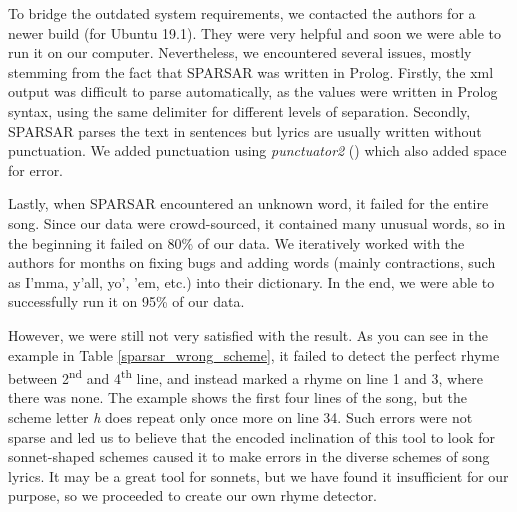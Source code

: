 To bridge the outdated system requirements, we contacted the authors for a newer build (for Ubuntu 19.1). They were very helpful and soon we were able to run it on our computer. Nevertheless, we encountered several issues, mostly stemming from the fact that SPARSAR was written in Prolog. Firstly, the xml output was difficult to parse automatically, as the values were written in Prolog syntax, using the same delimiter for different levels of separation. Secondly, SPARSAR parses the text in sentences but lyrics are usually written without punctuation. We added punctuation using \textit{punctuator2} (\cite{tilk2016punctuation}) which also added space for error. 

Lastly, when SPARSAR encountered an unknown word, it failed for the entire song. Since our data were crowd-sourced, it contained many unusual words, so in the beginning it failed on 80\% of our data. We iteratively worked with the authors for months on fixing bugs and adding words (mainly contractions, such as I'mma, y'all, yo', 'em, etc.) into their dictionary. In the end, we were able to successfully run it on 95\% of our data.

However, we were still not very satisfied with the result. As you can see in the example in Table \ref{sparsar_wrong_scheme}, it failed to detect the perfect rhyme between 2\textsuperscript{nd} and 4\textsuperscript{th} line, and instead marked a rhyme on line 1 and 3, where there was none. The example shows the first four lines of the song, but the scheme letter \textit{h} does repeat only once more on line 34. Such errors were not sparse and led us to believe that the encoded inclination of this tool to look for sonnet-shaped schemes caused it to make errors in the diverse schemes of song lyrics. It may be a great tool for sonnets, but we have found it insufficient for our purpose, so we proceeded to create our own rhyme detector.



